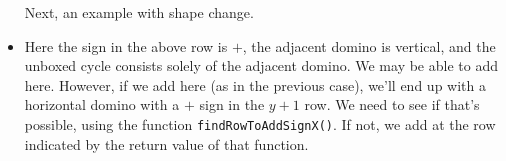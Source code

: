 \documentclass[12pt]{article}
\numberwithin{equation}{section}
\newcommand{\verticalDominoMaybe}[3]{\filldraw [dominoMaybeStyle] (#2 - 1 + \eps,  #1 - 1 + \eps) rectangle + (1 - \teps,2 -\teps) node [dominoText] {$#3$};}
\newcommand{\horizontalDominoMaybeShift}[4]{\filldraw [dominoMaybeStyle] (#2 - 1 + #4 + \eps, #1 - 1 + \eps) rectangle + (2 - \teps, 1 -\teps) node [dominoText] {$#3$};}
\begin{document}
\begin{itemize}
    Next, an example with shape change.
    \begin{figure}[H]
      \centering
    \end{figure}
    \begin{figure}[H]
      \centering
    \end{figure}
    \item Here the sign in the above row is $+$,
    the adjacent domino is vertical, and the unboxed cycle consists solely of the adjacent domino.
    We may be able to add here.
    However, if we add here (as in the previous case), we'll end up with a horizontal domino with a $+$ sign in the $y + 1$ row.
    We need to see if that's possible, using the function \texttt{findRowToAddSignX()}.
    If not, we add at the row indicated by the return value of that function.


\end{itemize}
\end{document}
